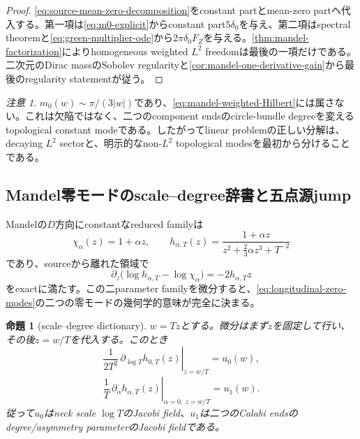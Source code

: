 \documentclass[11pt,a4paper]{ltjsarticle}
\newtheorem{proposition}[theorem]{命題}
\theoremstyle{definition}
\theoremstyle{remark}
\newtheorem{remark}[theorem]{注意}
\begin{document}
\begin{proof}
\eqref{eq:source-mean-zero-decomposition}をconstant partとmean-zero partへ代入する。第一項は\eqref{eq:m0-explicit}からconstant part$5\delta_0$を与え、第二項はspectral theoremと\eqref{eq:green-multiplier-ode}から$2\pi\delta_0F_Z$を与える。\cref{thm:mandel-factorization}によりhomogeneous weighted $L^2$ freedomは最後の一項だけである。二次元のDirac massのSobolev regularityと\cref{cor:mandel-one-derivative-gain}から最後のregularity statementが従う。
\end{proof}

\begin{remark}
$m_0(w)\sim\pi/(3|w|)$であり、\eqref{eq:mandel-weighted-Hilbert}には属さない。これは欠陥ではなく、二つのcomponent endsのcircle-bundle degreeを変えるtopological constant modeである。したがってlinear problemの正しい分解は、decaying $L^2$ sectorと、明示的なnon-$L^2$ topological modesを最初から分けることである。
\end{remark}


\subsection{Mandel零モードのscale--degree辞書と五点源jump}
\label{subsec:scale-degree-dictionary}

Mandelの$D$方向にconstantなreduced familyは
\begin{equation}\label{eq:exact-mandel-two-parameter-family}
 \chi_{\alpha}(z)=1+\alpha z,
 \qquad
 h_{\alpha,T}(z)
 =\frac{1+\alpha z}
 {z^2+\frac23\alpha z^3+T^{-2}}
\end{equation}
であり、sourceから離れた領域で
\begin{equation}\label{eq:exact-mandel-reduced-ode}
 \partial_z\bigl(\log h_{\alpha,T}-\log\chi_\alpha\bigr)
 =-2h_{\alpha,T}z
\end{equation}
をexactに満たす\cite{Mandel}。この二parameter familyを微分すると、\eqref{eq:longitudinal-zero-modes}の二つの零モードの幾何学的意味が完全に決まる。

\begin{proposition}[scale--degree dictionary]\label{prop:scale-degree-dictionary}
$w=Tz$とする。微分はまず$z$を固定して行い、その後$z=w/T$を代入する。このとき
\begin{equation}\label{eq:u0-scale-derivative}
 \left.
 \frac1{2T^2}\,\partial_{\log T}h_{0,T}(z)
 \right|_{z=w/T}
 =u_0(w),
\end{equation}
\begin{equation}\label{eq:u1-degree-derivative}
 \left.
 \frac1T\,\partial_{\alpha}h_{\alpha,T}(z)
 \right|_{\alpha=0,\ z=w/T}
 =u_1(w).
\end{equation}
従って$u_0$はneck scale $\log T$のJacobi field、$u_1$は二つのCalabi endsのdegree/asymmetry parameterのJacobi fieldである。
\end{proposition}
\end{document}
